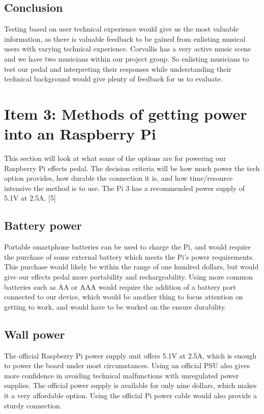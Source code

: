 \documentclass{article}
\begin{document}
\subsection{Conclusion}
Testing based on user technical experience would give us the most valuable information, as there is valuable feedback to be gained from enlisting musical users with varying technical experience. Corvallis has a very active music scene and we have two musicians within our project group. So enlisting musicians to test our pedal and interpreting their responses while understanding their technical background would give plenty of feedback for us to evaluate. 

\section{Item 3: Methods of getting power into an Raspberry Pi}
This section will look at what some of the options are for powering our Raspberry Pi effects pedal. The decision criteria will be how much power the tech option provides, how durable the connection it is, and how time/resource intensive the method is to use. The Pi 3 has a recommended power supply of 5.1V at 2.5A. [5]

\subsection{Battery power}
Portable smartphone batteries can be used to charge the Pi, and would require the purchase of some external battery which meets the Pi's power requirements. This purchase would likely be within the range of one hundred dollars, but would give our effects pedal more portability and rechargeability.  Using more common batteries such as AA or AAA would require the addition of a battery port connected to our device, which would be another thing to focus attention on getting to work, and would have to be worked on the ensure durability. 

\subsection{Wall power}
The official Raspberry Pi power supply unit offers 5.1V at 2.5A, which is enough to power the board under most circumstances. Using an official PSU also gives more confidence in avoiding technical malfunctions with unregulated power supplies. The official power supply is available for only nine dollars, which makes it a very affordable option. Using the official Pi power cable would also provide a sturdy connection. 
\end{document}
